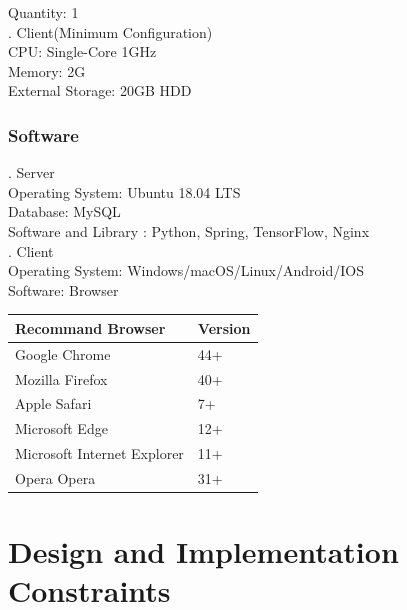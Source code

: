 \documentclass[16pt]{scrreprt}
\begin{document}
 
Quantity: 1\\

 
. Client(Minimum Configuration)\\

 
CPU: Single-Core 1GHz\\

 
Memory: 2G\\

 
External Storage: 20GB HDD\\

 
\subsubsection{Software}

 
. Server\\

 
Operating System: Ubuntu 18.04 LTS\\

 
Database: MySQL\\

 
Software and Library : Python, Spring, TensorFlow, Nginx\\

 
. Client\\

 
Operating System: Windows/macOS/Linux/Android/IOS\\

 
Software: Browser\\

 
\begin{center}
    \begin{tabular}{p{7cm}p{7cm}}
        \hline
	    Recommand Browser & Version\\
        \hline
	    Google Chrome &  44+\\
        \hline
	    Mozilla Firefox & 40+\\
        \hline
        Apple Safari & 7+\\
        \hline
        Microsoft Edge & 12+\\
        \hline
        Microsoft Internet Explorer & 11+\\
        \hline
        Opera Opera & 31+\\
        \hline

 
    \end{tabular}
\end{center}

 
\section{Design and Implementation Constraints}
\end{document}

